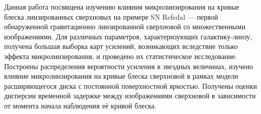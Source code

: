 Данная работа посвящена изучению влияния микролинзирования на кривые блеска линзированных сверхновых на примере SN Refsdal — первой обнаруженной гравитационно линзированной сверхновой со множественными изображениями. Для различных параметров, характеризующих галактику-линзу, получена большая выборка карт усилений, возникающих вследствие только эффекта микролинзирования, и проведено их статистическое исследование. Построены распределения вероятности усиления в звездных величинах, изучено влияние микролинзирования на кривые блеска сверхновой в рамках модели расширяющегося диска с постоянной поверхностной яркостью. Получены оценки дисперсии временной задержке между изображениями сверхновой в зависимости от момента начала наблюдения её кривой блеска.

